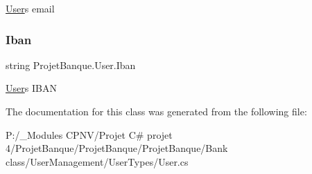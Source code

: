 \mbox{\hyperlink{class_projet_banque_1_1_user}{User}}\textquotesingle{}s email 

\mbox{\label{class_projet_banque_1_1_user_a39250d0a9d06279f2d45c2fe0ad6aada}} 
\subsubsection{\texorpdfstring{Iban}{Iban}}
{\footnotesize\ttfamily string Projet\+Banque.\+User.\+Iban\hspace{0.3cm}{\ttfamily [get]}}



\mbox{\hyperlink{class_projet_banque_1_1_user}{User}}\textquotesingle{}s I\+B\+AN 



The documentation for this class was generated from the following file\+:\begin{DoxyCompactItemize}
\item 
P\+:/\+\_\+\+Modules C\+P\+N\+V/\+Projet C\# projet 4/\+Projet\+Banque/\+Projet\+Banque/\+Projet\+Banque/\+Bank class/\+User\+Management/\+User\+Types/User.\+cs\end{DoxyCompactItemize}
